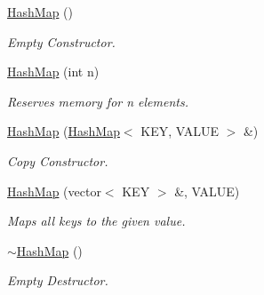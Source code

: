 {\bf }\par
\begin{DoxyCompactItemize}
\item 
\hypertarget{class_hash_map_ace56e25bbddde14be403a9b2224dd364}{}\hyperlink{class_hash_map_ace56e25bbddde14be403a9b2224dd364}{Hash\+Map} ()\label{class_hash_map_ace56e25bbddde14be403a9b2224dd364}

\begin{DoxyCompactList}\small\item\em Empty Constructor. \end{DoxyCompactList}\item 
\hypertarget{class_hash_map_a921ee1145e96f83f3776f0100b8f7275}{}\hyperlink{class_hash_map_a921ee1145e96f83f3776f0100b8f7275}{Hash\+Map} (int n)\label{class_hash_map_a921ee1145e96f83f3776f0100b8f7275}

\begin{DoxyCompactList}\small\item\em Reserves memory for n elements. \end{DoxyCompactList}\item 
\hypertarget{class_hash_map_a2a86d581bca37b123a56f1198337a792}{}\hyperlink{class_hash_map_a2a86d581bca37b123a56f1198337a792}{Hash\+Map} (\hyperlink{class_hash_map}{Hash\+Map}$<$ K\+E\+Y, V\+A\+L\+U\+E $>$ \&)\label{class_hash_map_a2a86d581bca37b123a56f1198337a792}

\begin{DoxyCompactList}\small\item\em Copy Constructor. \end{DoxyCompactList}\item 
\hypertarget{class_hash_map_a65b3b62f510bb745a886ef7e9618324c}{}\hyperlink{class_hash_map_a65b3b62f510bb745a886ef7e9618324c}{Hash\+Map} (vector$<$ K\+E\+Y $>$ \&, V\+A\+L\+U\+E)\label{class_hash_map_a65b3b62f510bb745a886ef7e9618324c}

\begin{DoxyCompactList}\small\item\em Maps all keys to the given value. \end{DoxyCompactList}\item 
\hypertarget{class_hash_map_a92ad972027e37d1d8f3d311a441190fc}{}\hyperlink{class_hash_map_a92ad972027e37d1d8f3d311a441190fc}{$\sim$\+Hash\+Map} ()\label{class_hash_map_a92ad972027e37d1d8f3d311a441190fc}

\begin{DoxyCompactList}\small\item\em Empty Destructor. \end{DoxyCompactList}\end{DoxyCompactItemize}

